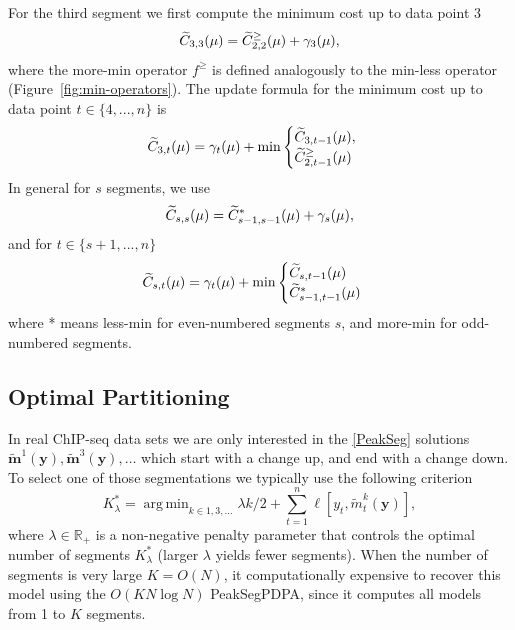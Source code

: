 \documentclass{article}
\DeclareMathOperator*{\argmin}{arg\,min}
\newcommand{\RR}{\mathbb R}
\begin{document}
For the third segment we first compute the minimum cost up to data point 3
\begin{equation*}
  \widetilde{C}_{3,3}(\mu) = \widetilde{C}_{2,2}^{\geq}(\mu) + \gamma_3(\mu),
\end{equation*}
where the more-min operator $f^\geq$ is defined analogously to the
min-less operator (Figure~\ref{fig:min-operators}). The update formula
for the minimum cost up to data point $t\in\{4, ..., n\}$ is
\begin{equation*}
  \widetilde{C}_{3,t}(\mu) = \gamma_t(\mu) + \min
  \begin{cases}
    \widetilde{C}_{3,t-1}(\mu),\\
    \widetilde{C}_{2,t-1}^{\geq}(\mu)
  \end{cases}
\end{equation*}
In general for $s$ segments, we use
\begin{equation}
  \widetilde{C}_{s,s}(\mu) = \widetilde{C}_{s-1,s-1}^{*}(\mu) + \gamma_s(\mu),
\end{equation}
and for $t\in\{s+1, ..., n\}$
\begin{equation}
  \widetilde{C}_{s,t}(\mu) = \gamma_t(\mu)+\min
  \begin{cases}
    \widetilde{C}_{s,t-1}(\mu)\\
    \widetilde{C}_{s-1,t-1}^{*}(\mu)
  \end{cases}
\end{equation}
where * means less-min for even-numbered segments $s$, and more-min
for odd-numbered segments.

\subsection{Optimal Partitioning}

In real ChIP-seq data sets we are only interested in the \ref{PeakSeg}
solutions
$\mathbf{\tilde m}^1(\mathbf y), \mathbf{\tilde m}^3(\mathbf y), \dots$
which start with a change up, and end with a change down. To select
one of those segmentations we typically use the following criterion
\begin{equation}
  \label{eq:selection}
  K^*_\lambda = \argmin_{k\in 1,3, \dots}
  \lambda k/2 +
\sum_{t=1}^n
  \ell[ y_t, \tilde m_t^k(\mathbf y) ],
\end{equation}
where $\lambda\in\RR_+$ is a non-negative penalty parameter 
that controls the optimal number of segments $K^*_\lambda$
(larger $\lambda$ yields fewer segments).
When the number of segments is very large $K =O(N)$, 
it computationally expensive to recover this model
using the $O(K N\log N)$ PeakSegPDPA, 
since it computes all models from 1 to $K$ segments.
\end{document}

